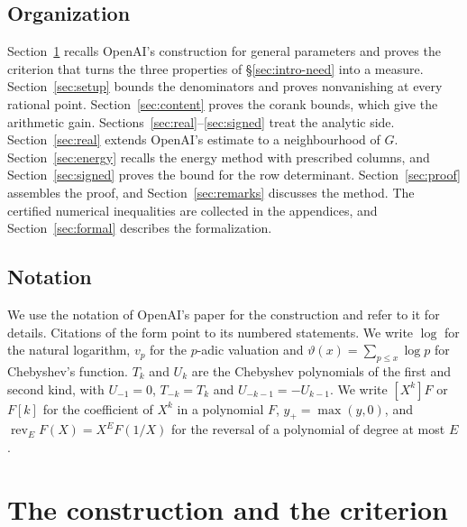 \documentclass[11pt]{amsart}
\theoremstyle{definition}
\theoremstyle{remark}
\numberwithin{equation}{section}
\begin{document}
\subsection{Organization}
Section~\ref{sec:overview} recalls OpenAI's construction for general parameters and proves the criterion
that turns the three properties of \S\ref{sec:intro-need} into a measure. Section~\ref{sec:setup} bounds the
denominators and proves nonvanishing at every rational point. Section~\ref{sec:content} proves the corank
bounds, which give the arithmetic gain. Sections~\ref{sec:real}--\ref{sec:signed} treat the analytic side.
Section~\ref{sec:real} extends OpenAI's estimate to a neighbourhood of $G$. Section~\ref{sec:energy} recalls
the energy method with prescribed columns, and Section~\ref{sec:signed} proves the bound for the row
determinant. Section~\ref{sec:proof} assembles the proof, and Section~\ref{sec:remarks} discusses the
method. The certified numerical inequalities are collected in the appendices, and
Section~\ref{sec:formal} describes the formalization.

\subsection{Notation}
We use the notation of OpenAI's paper \cite{OpenAI2026} for the construction and refer to it for details.
Citations of the form \cite[Prop.~2.1]{OpenAI2026} point to its numbered statements. We write $\log$ for
the natural logarithm, $v_p$ for the $p$-adic valuation and $\vartheta(x)=\sum_{p\le x}\log p$ for
Chebyshev's function. $T_k$ and $U_k$ are the Chebyshev polynomials of the first and second kind, with
$U_{-1}=0$, $T_{-k}=T_k$ and $U_{-k-1}=-U_{k-1}$. We write $[X^k]F$ or $F[k]$ for the coefficient of $X^k$
in a polynomial $F$, $y_+=\max(y,0)$, and $\operatorname{rev}_EF(X)=X^EF(1/X)$ for the reversal of a
polynomial of degree at most $E$.

\section{The construction and the criterion}\label{sec:overview}
\end{document}

